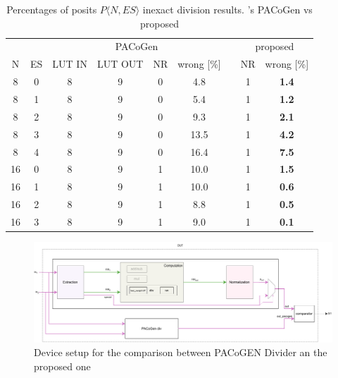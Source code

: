 \begin{table}
\begin{center}
\begin{savenotes}
\begin{tabular}{ccccccccc}
    \toprule
     & & \multicolumn{4}{c}{PACoGen} & & \multicolumn{2}{c}{proposed} \\
    \cmidrule{3-6} \cmidrule{8-9}
    N & ES & LUT IN & LUT OUT & NR & wrong [\%] & & NR & wrong [\%] \\
    \midrule \midrule
    8 & 0 & 8 & 9 & 0 & 4.8 & & 1 & \textbf{1.4} \\
    8 & 1 & 8 & 9 & 0 & 5.4 & & 1 & \textbf{1.2} \\
    8 & 2 & 8 & 9 & 0 & 9.3 & & 1 & \textbf{2.1} \\
    8 & 3 & 8 & 9 & 0 & 13.5 & & 1 & \textbf{4.2} \\
    8 & 4 & 8 & 9 & 0 & 16.4 & & 1 & \textbf{7.5} \\
    \midrule
    16 & 0 & 8 & 9 & 1 & 10.0 & & 1 & \textbf{1.5} \\
    16 & 1 & 8 & 9 & 1 & 10.0 & & 1 & \textbf{0.6} \\
    16 & 2 & 8 & 9 & 1 & 8.8 & & 1 & \textbf{0.5} \\
    16 & 3 & 8 & 9 & 1 & 9.0 & & 1 & \textbf{0.1} \\
    \bottomrule
\end{tabular}
\end{savenotes}
\caption{Percentages of posits $P\langle N,ES\rangle$ inexact division results. \cite{PACoGen}'s PACoGen vs proposed}
\label{table:comparison_div_against_pacogen_table}
\end{center}
\end{table}


\begin{figure}
        \includegraphics[width=\textwidth]{figures/pacogen_vs_me_dut.pdf}
        \caption{Device setup for the comparison between PACoGEN Divider an the proposed one}
        \label{fig:comparison_against_pacogogen_dut}
\end{figure}